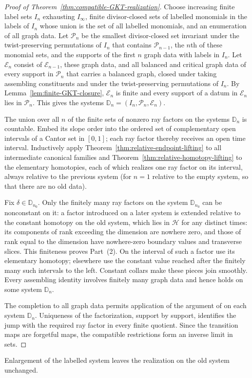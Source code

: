 \begin{proof}[Proof of Theorem~\ref{thm:compatible-GKT-realization}]
Choose increasing finite label sets $I_n$ exhausting $I_\infty$,
finite divisor-closed sets of labelled monomials in the labels of $I_n$
whose union is the set of all labelled monomials, and an enumeration of
all graph data.  Let $\mathscr P_n$ be the smallest divisor-closed set invariant under
the twist-preserving permutations of $I_n$ that contains $\mathscr P_{n-1}$, the $n$th
of these monomial sets, and the supports of the first $n$ graph data with
labels in $I_n$.  Let $\mathcal E_n$ consist of $\mathcal E_{n-1}$, these
graph data, and all balanced and critical graph data of every support in $\mathscr P_n$
that carries a balanced graph, closed under taking assembling constituents
and under the twist-preserving permutations of $I_n$.  By
Lemma~\ref{lem:finite-GKT-closure}, $\mathcal E_n$ is finite and every
support of a datum in $\mathcal E_n$ lies in $\mathscr P_n$.  This gives the systems
$\mathbb D_n=(I_n,\mathscr P_n,\mathcal E_n)$.

The union over all $n$ of the finite sets of nonzero ray factors on the
systems $\mathbb D_n$ is countable.  Embed its slope order into the ordered set of complementary
open intervals of a Cantor set in $[0,1]$; each ray factor thereby receives an
open time interval.  Inductively apply
Theorem~\ref{thm:relative-endpoint-lifting} to all intermediate canonical
families and Theorem~\ref{thm:relative-homotopy-lifting} to the elementary
homotopies, each of which realizes one ray factor on its interval, always
relative to the previous system (for $n=1$ relative to the empty system, so
that there are no old data).

Fix $\delta\in\mathbb D_{n_0}$.  Only the finitely many ray factors on the
system $\mathbb D_{n_0}$ can be nonconstant on it: a factor introduced on a
later system is extended relative to the constant homotopy on the old system, which lies in
$\mathcal H$ for any distinct times: its components of rank exceeding the
dimension are nowhere zero, and those of rank equal to the dimension have
nowhere-zero boundary values and transverse slices.  This
finiteness proves Part~(2).  On the interval of such a factor use its
elementary homotopy; elsewhere use the constant value reached after the
finitely many such intervals to the left.  Constant collars make these
pieces join smoothly.  Every assembling identity involves finitely many
graph data and hence holds on some system $\mathbb D_n$.

The completion to all graph data permits application of the argument of
\cite[Thm.~5.13]{grossetal2022open} on each system $\mathbb D_n$.  Uniqueness of the
factorization, support by support, identifies the jump with the required ray
factor in every finite quotient.  Since the transition maps are forgetful
maps, the compatible restrictions form an inverse limit in sets.
\end{proof}

Enlargement of the labelled system leaves the realization on the old system
unchanged.
